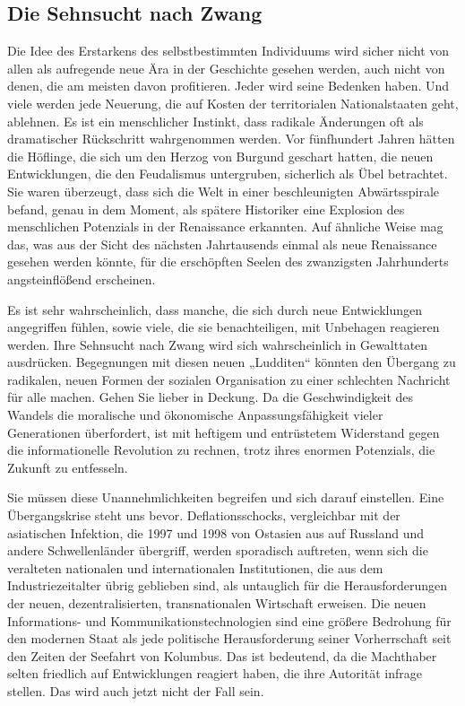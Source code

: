 \documentclass[
  a5paper,
  smalldemyvopaper,10pt,twoside,onecolumn,openright,extrafontsizes,hidelinks]{memoir}
\begin{document}
\subsection{Die Sehnsucht nach Zwang}\label{die-sehnsucht-nach-zwang}

Die Idee des Erstarkens des selbstbestimmten Individuums wird sicher
nicht von allen als aufregende neue Ära in der Geschichte gesehen
werden, auch nicht von denen, die am meisten davon profitieren. Jeder
wird seine Bedenken haben. Und viele werden jede Neuerung, die auf
Kosten der territorialen Nationalstaaten geht, ablehnen. Es ist ein
menschlicher Instinkt, dass radikale Änderungen oft als dramatischer
Rückschritt wahrgenommen werden. Vor fünfhundert Jahren hätten die
Höflinge, die sich um den Herzog von Burgund geschart hatten, die neuen
Entwicklungen, die den Feudalismus untergruben, sicherlich als Übel
betrachtet. Sie waren überzeugt, dass sich die Welt in einer
beschleunigten Abwärtsspirale befand, genau in dem Moment, als spätere
Historiker eine Explosion des menschlichen Potenzials in der Renaissance
erkannten. Auf ähnliche Weise mag das, was aus der Sicht des nächsten
Jahrtausends einmal als neue Renaissance gesehen werden könnte, für die
erschöpften Seelen des zwanzigsten Jahrhunderts angsteinflößend
erscheinen.

Es ist sehr wahrscheinlich, dass manche, die sich durch neue
Entwicklungen angegriffen fühlen, sowie viele, die sie benachteiligen,
mit Unbehagen reagieren werden. Ihre Sehnsucht nach Zwang wird sich
wahrscheinlich in Gewalttaten ausdrücken. Begegnungen mit diesen neuen
„Ludditen`` könnten den Übergang zu radikalen, neuen Formen der sozialen
Organisation zu einer schlechten Nachricht für alle machen. Gehen Sie
lieber in Deckung. Da die Geschwindigkeit des Wandels die moralische und
ökonomische Anpassungsfähigkeit vieler Generationen überfordert, ist mit
heftigem und entrüstetem Widerstand gegen die informationelle Revolution
zu rechnen, trotz ihres enormen Potenzials, die Zukunft zu entfesseln.

Sie müssen diese Unannehmlichkeiten begreifen und sich darauf
einstellen. Eine Übergangskrise steht uns bevor. Deflationsschocks,
vergleichbar mit der asiatischen Infektion, die 1997 und 1998 von
Ostasien aus auf Russland und andere Schwellenländer übergriff, werden
sporadisch auftreten, wenn sich die veralteten nationalen und
internationalen Institutionen, die aus dem Industriezeitalter übrig
geblieben sind, als untauglich für die Herausforderungen der neuen,
dezentralisierten, transnationalen Wirtschaft erweisen. Die neuen
Informations- und Kommunikationstechnologien sind eine größere Bedrohung
für den modernen Staat als jede politische Herausforderung seiner
Vorherrschaft seit den Zeiten der Seefahrt von Kolumbus. Das ist
bedeutend, da die Machthaber selten friedlich auf Entwicklungen reagiert
haben, die ihre Autorität infrage stellen. Das wird auch jetzt nicht der
Fall sein.
\end{document}
